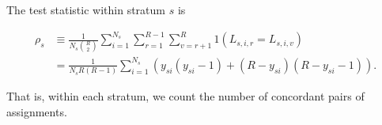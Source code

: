 The test statistic within stratum $s$ is

\begin{align*}
\rho_s &\equiv \frac{1}{N_s {R \choose 2}} \sum_{i=1}^{N_s}
              \sum_{r=1}^{R-1} \sum_{v=r+1}^R 1(L_{s,i,r} = L_{s,i,v}) \\
       &= \frac{1}{N_s R(R-1)} \sum_{i=1}^{N_s}
                (y_{si}(y_{si}-1) + (R-y_{si})(R-y_{si}-1)).
\end{align*}

That is, within each stratum, we count the number of concordant pairs of
assignments.

